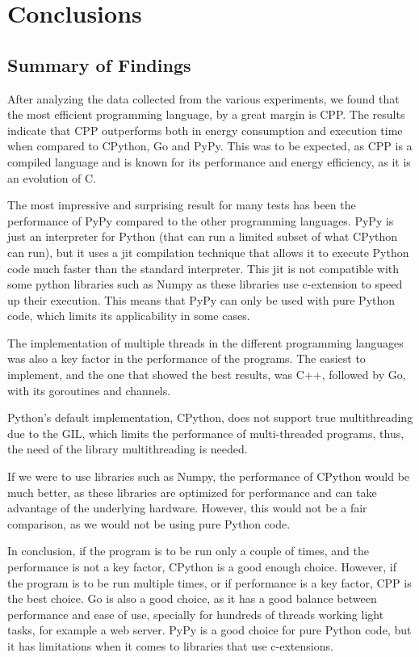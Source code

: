 \chapter{Conclusions}\label{chap:conclusions}


\section{Summary of Findings}
After analyzing the data collected from the various experiments, we found that the most efficient programming language, by a great margin is \gls{CPP}. The results indicate that \gls{CPP} outperforms both in energy consumption and execution time when compared to \gls{CPython}, Go and PyPy. This was to be expected, as \gls{CPP} is a compiled language and is known for its performance and energy efficiency, as it is an evolution of C.

The most impressive and surprising result for many tests has been the performance of PyPy compared to the other programming languages. PyPy is just an interpreter for Python (that can run a limited subset of what \gls{CPython} can run), but it uses a \gls{jit} compilation technique that allows it to execute Python code much faster than the standard interpreter. This \gls{jit} is not compatible with some python libraries such as Numpy \cite{numpy} as these libraries use \gls{c-extension} to speed up their execution. This means that PyPy can only be used with pure Python code, which limits its applicability in some cases.

The implementation of multiple threads in the different programming languages was also a key factor in the performance of the programs. The easiest to implement, and the one that showed the best results, was C++, followed by Go, with its \glspl{goroutine} and \glspl{channel}. 

Python's default implementation, \gls{CPython}, does not support true multithreading due to the \gls{GIL}, which limits the performance of multi-threaded programs, thus, the need of the library multithreading is needed.

If we were to use libraries such as Numpy, the performance of \gls{CPython} would be much better, as these libraries are optimized for performance and can take advantage of the underlying hardware. However, this would not be a fair comparison, as we would not be using pure Python code.

In conclusion, if the program is to be run only a couple of times, and the performance is not a key factor, \gls{CPython} is a good enough choice. However, if the program is to be run multiple times, or if performance is a key factor, \gls{CPP} is the best choice. Go is also a good choice, as it has a good balance between performance and ease of use, specially for hundreds of threads working light tasks, for example a web server. PyPy is a good choice for pure Python code, but it has limitations when it comes to libraries that use \glspl{c-extension}.

